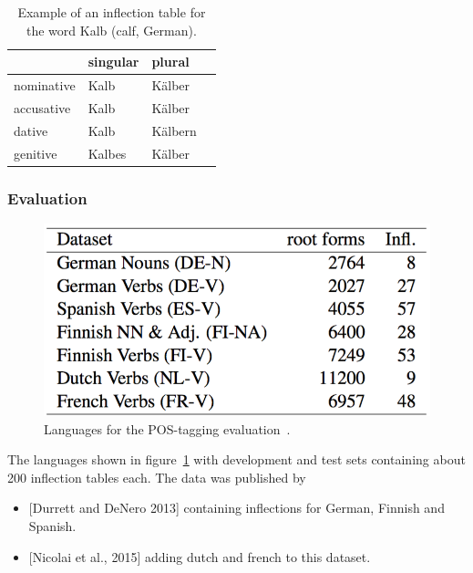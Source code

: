 \begin{table}
\begin{center}
\begin{tabular}{ l l l l }
  \hline
             & singular & plural \\ \hline
  nominative & Kalb & K\"alber \\
  accusative & Kalb & K\"alber \\
  dative & Kalb & K\"albern \\
  genitive & Kalbes & K\"alber \\
\end{tabular}
\end{center}
\caption{Example of an inflection table for the word Kalb (calf, German).}
\label{tab:inflections}
\end{table}

\subsubsection{Evaluation}

\begin{figure}[H]
\begin{center}
  \includegraphics[width=.5\linewidth]{../slides/images/data_inflections}
  \caption{Languages for the POS-tagging evaluation~\cite{DBLP:journals/corr/FaruquiTND15}.}
  \label{fig:inflection-languages}
\end{center}
\end{figure}

The languages shown in figure~\ref{fig:inflection-languages} with
development and test sets containing about 200 inflection tables each.
The data was published by
\begin{itemize}
\item {[}Durrett and DeNero 2013{]} containing inflections for German, Finnish and Spanish.
\item {[}Nicolai et al., 2015{]} adding dutch and french to this dataset.
\end{itemize}

